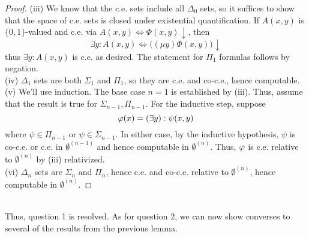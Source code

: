 \documentclass{amsart}
\begin{document}
\begin{proof}
		(iii) We know that the c.e. sets include all $\Delta_0$ sets, so it suffices to show that the space of c.e. sets is closed under existential quantification. If $A(x,y)$ is $\{0,1\}$-valued and c.e. via $A(x,y)\iff \Phi(x,y)\downarrow$, then $$\exists y: A(x,y) \iff \Big((\mu y)\Phi(x,y)\Big)\downarrow$$
		thus $\exists y: A(x,y)$ is c.e. as desired. The statement for $\Pi_1$ formulas follows by negation.\\
		
		(iv) $\Delta_1$ sets are both $\Sigma_1$ and $\Pi_1$, so they are c.e. and co-c.e., hence computable. \\
		
		(v) We'll use induction. The base case $n=1$ is established by (iii). Thus, assume that the result is true for $\Sigma_{n-1},\Pi_{n-1}$. For the inductive step, suppose 
		$$\varphi(x) = (\exists y): \psi(x,y)$$
		where $\psi\in \Pi_{n-1}$ or $\psi\in \Sigma_{n-1}$. In either case, by the inductive hypothesis, $\psi$ is co-c.e. or c.e. in $\emptyset^{(n-1)}$ and hence computable in $\emptyset^{(n)}$. Thus, $\varphi$ is c.e. relative to $\emptyset^{(n)}$ by (iii) relativized.\\
		
		(vi) $\Delta_n$ sets are $\Sigma_n$ and $\Pi_n$, hence c.e. and co-c.e. relative to $\emptyset^{(n)}$, hence computable in $\emptyset^{(n)}$.
		
	\end{proof}\\
	
	Thus, question 1 is resolved. As for question 2, we can now show converses to several of the results from the previous lemma.\\
	
\end{document}
